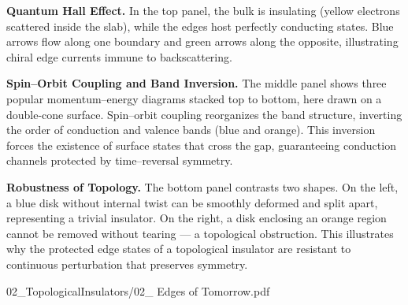 \begin{SideNotePage}{

  \textbf{Quantum Hall Effect.} \; In the top panel, the bulk is insulating (yellow electrons scattered inside the slab), while the edges host perfectly conducting states. Blue arrows flow along one boundary and green arrows along the opposite, illustrating chiral edge currents immune to backscattering.

  \vspace{0.5em}
  \textbf{Spin–Orbit Coupling and Band Inversion.} \; The middle panel shows three popular momentum–energy diagrams stacked top to bottom, here drawn on a double-cone surface. Spin–orbit coupling reorganizes the band structure, inverting the order of conduction and valence bands (blue and orange). This inversion forces the existence of surface states that cross the gap, guaranteeing conduction channels protected by time–reversal symmetry.

  \vspace{0.5em}
  \textbf{Robustness of Topology.} \; The bottom panel contrasts two shapes. On the left, a blue disk without internal twist can be smoothly deformed and split apart, representing a trivial insulator. On the right, a disk enclosing an orange region cannot be removed without tearing — a topological obstruction. This illustrates why the protected edge states of a topological insulator are resistant to continuous perturbation that preserves symmetry.

}{02_TopologicalInsulators/02_ Edges of Tomorrow.pdf}
\end{SideNotePage}